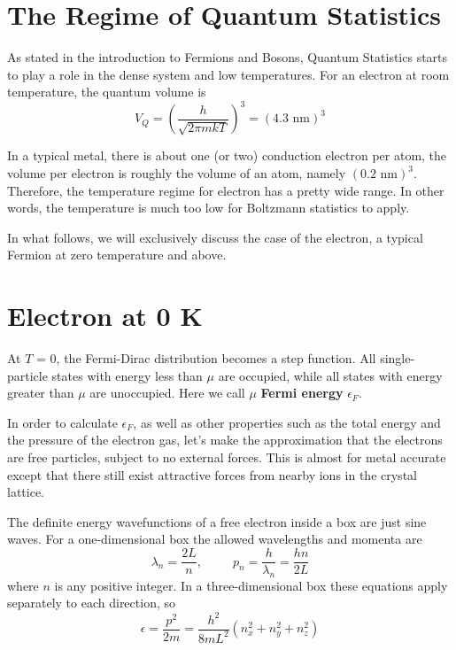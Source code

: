 
\section{The Regime of Quantum Statistics}
As stated in the introduction to Fermions and Bosons, Quantum Statistics starts to play a role in the dense system and low temperatures.
For an electron at room temperature, the quantum volume is
\begin{equation}
V_Q = (\frac{h}{\sqrt{2\pi mkT}})^3 = (\textrm{4.3~nm})^3
\end{equation}

In a typical metal, there is about one (or two) conduction electron per atom, the volume per electron is roughly the volume of an atom, namely $(\textrm{0.2 nm})^3$. Therefore, the temperature regime for electron has a pretty wide range. In other words, the temperature is much too low for Boltzmann statistics to apply.

In what follows, we will exclusively discuss the case of the electron, a typical Fermion at zero  temperature and above.

\section{Electron at 0 K}
At $T$ = 0, the Fermi-Dirac distribution becomes a step function. All single-particle states with energy less than $\mu$ are occupied, while all states with energy greater than $\mu$ are unoccupied. Here we call $\mu$ \textbf{Fermi energy} $\epsilon_F$.

In order to calculate $\epsilon_F$, as well as other properties such as the total energy and the pressure of the electron gas,
let's make the approximation that the electrons are free particles, subject to no external forces. 
This is almost for metal accurate except that there still exist attractive forces from nearby ions in the crystal lattice.

The definite energy wavefunctions of a free electron inside a box are just sine waves. For a one-dimensional box the allowed wavelengths and momenta are
\begin{equation}
\lambda_n = \frac{2L}{n}, ~~~~~~~~~~~ p_n = \frac{h}{\lambda_n} = \frac{hn}{2L}
\end{equation}
where $n$ is any positive integer. In a three-dimensional box these equations apply separately to each direction, so
\begin{equation}
\epsilon = \frac{p^2}{2m} = \frac{h^2}{8mL^2}(n_x^2+n_y^2+n_z^2)
\end{equation}

